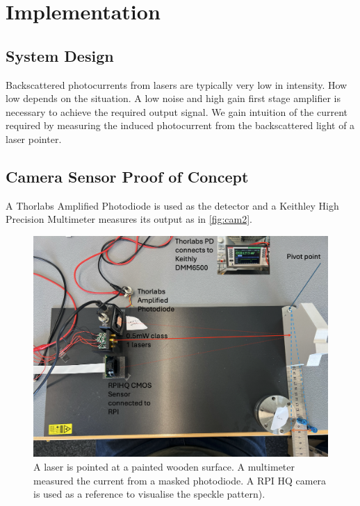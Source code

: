 \section{Implementation}
\label{sec:implementation}

\subsection{System Design}

Backscattered photocurrents from lasers are typically very low in intensity. How low depends on the situation. A low noise and high gain first stage amplifier is necessary to achieve the required output signal.  We gain intuition of the current required by measuring the induced photocurrent from the backscattered light of a laser pointer. 

\subsection{Camera Sensor Proof of Concept}
A Thorlabs Amplified Photodiode is used as the detector and a Keithley High Precision Multimeter measures its output as in \ref{fig:cam2}.

\begin{figure}[t]
  \centering
  \includegraphics[width=\widthnarrow]{figures/impl/camera_setup.png}
  \caption{A laser is pointed at a painted wooden surface. A multimeter measured the current from a masked photodiode. A RPI HQ camera is used as a reference to visualise the speckle pattern).}
  \label{fig:cam1}
\end{figure} 


